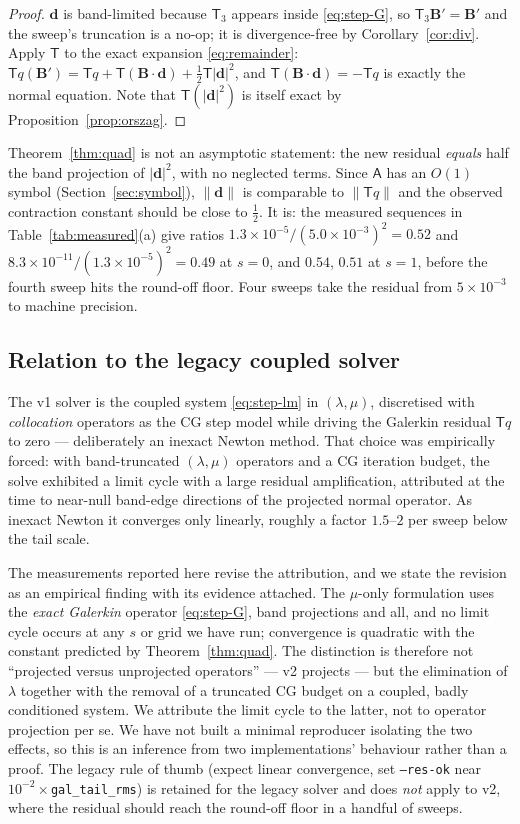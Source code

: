 \documentclass[11pt]{article}
\theoremstyle{definition}
\newcommand{\B}{\mathbf{B}}
\newcommand{\dd}{\mathbf{d}}
\newcommand{\Tr}{\mathsf{T}}
\newcommand{\Trr}{\mathsf{T}_3}
\newcommand{\Aop}{\mathsf{A}}
\begin{document}
\begin{proof}
$\dd$ is band-limited because $\Trr$ appears inside \eqref{eq:step-G}, so
$\Trr\B'=\B'$ and the sweep's truncation is a no-op; it is divergence-free by
Corollary~\ref{cor:div}. Apply $\Tr$ to the exact expansion
\eqref{eq:remainder}: $\Tr q(\B')=\Tr q+\Tr(\B\cdot\dd)+\tfrac12\Tr|\dd|^2$,
and $\Tr(\B\cdot\dd)=-\Tr q$ is exactly the normal equation. Note that
$\Tr(|\dd|^2)$ is itself exact by Proposition~\ref{prop:orszag}.
\end{proof}

Theorem~\ref{thm:quad} is not an asymptotic statement: the new residual
\emph{equals} half the band projection of $|\dd|^2$, with no neglected terms.
Since $\Aop$ has an $O(1)$ symbol (Section~\ref{sec:symbol}), $\|\dd\|$ is
comparable to $\|\Tr q\|$ and the observed contraction constant should be
close to $\tfrac12$. It is: the measured sequences in
Table~\ref{tab:measured}(a) give ratios
$1.3\times10^{-5}/(5.0\times10^{-3})^2=0.52$ and
$8.3\times10^{-11}/(1.3\times10^{-5})^2=0.49$ at $s=0$, and $0.54$, $0.51$ at
$s=1$, before the fourth sweep hits the round-off floor. Four sweeps take the
residual from $5\times10^{-3}$ to machine precision.

\subsection{Relation to the legacy coupled solver}\label{sec:legacy}

The v1 solver is the coupled system \eqref{eq:step-lm} in $(\lambda,\mu)$,
discretised with \emph{collocation} operators as the CG step model while
driving the Galerkin residual $\Tr q$ to zero --- deliberately an inexact
Newton method. That choice was empirically forced: with band-truncated
$(\lambda,\mu)$ operators and a CG iteration budget, the solve exhibited a
limit cycle with a large residual amplification, attributed at the time to
near-null band-edge directions of the projected normal operator. As inexact
Newton it converges only linearly, roughly a factor $1.5$--$2$ per sweep below
the tail scale.

The measurements reported here revise the attribution, and we state the
revision as an empirical finding with its evidence attached. The $\mu$-only
formulation uses the \emph{exact Galerkin} operator \eqref{eq:step-G}, band
projections and all, and no limit cycle occurs at any $s$ or grid we have run;
convergence is quadratic with the constant predicted by
Theorem~\ref{thm:quad}. The distinction is therefore not ``projected versus
unprojected operators'' --- v2 projects --- but the elimination of $\lambda$
together with the removal of a truncated CG budget on a coupled, badly
conditioned system. We attribute the limit cycle to the latter, not to
operator projection per se. We have not built a minimal reproducer isolating
the two effects, so this is an inference from two implementations' behaviour
rather than a proof. The legacy rule of thumb (expect linear convergence, set
\texttt{--res-ok} near $10^{-2}\times$\texttt{gal\_tail\_rms}) is retained for
the legacy solver and does \emph{not} apply to v2, where the residual should
reach the round-off floor in a handful of sweeps.
\end{document}
